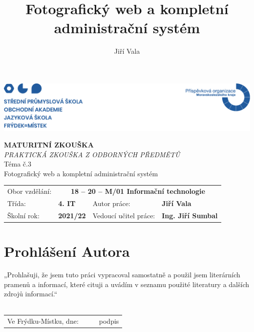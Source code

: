 \documentclass[12pt,a4paper]{report}
\title{Fotografický web a kompletní administrační systém}
\author{Jiří Vala}
\date{}
\begin{document}
\renewcommand*\listfigurename{}
\renewcommand{\figurename}{Obr.}
\renewcommand\refname{}



\begin{titlepage}
  \begin{adjustwidth}{-20mm}{-7.5mm} 
		\vspace*{-1.5cm}
		\noindent\includegraphics[width=\linewidth]{header.png}
	\end{adjustwidth}
	\begin{center}
		\vspace*{0.2cm}
    \color{pojblue}
		\Huge\textbf{MATURITNÍ ZKOUŠKA}
    \color{black}
    \vspace*{1cm} \\
		\large \emph{PRAKTICKÁ ZKOUŠKA Z ODBORNÝCH PŘEDMĚTŮ}
		\vspace*{1cm} \\
		\Large Téma č.3 \\
		\vspace*{1cm}
		\Large Fotografický web a kompletní administrační systém \\
		\vfill
		\normalsize
	\end{center}
	\begin{tabularx}{\textwidth}{l@{\hskip 0.5cm}XXl}
		Obor vzdělání: & \multicolumn{3}{c}{\textbf{18 – 20 – M/01 Informační technologie}} \\[10pt]
		Třída: & \textbf{4. IT} & Autor práce: & \textbf{Jiří Vala} \\[10pt]
		Školní rok: & \textbf{2021/22} & Vedoucí učitel práce: & \textbf{Ing. Jiří Sumbal}
		\vspace*{1cm}
	\end{tabularx}
\end{titlepage}

\section*{Prohlášení Autora}
  „Prohlašuji, že jsem tuto práci vypracoval samostatně a použil jsem literárních pramenů a informací, které cituji a uvádím v seznamu použité literatury a dalších zdrojů informací.“ \\
	\vspace*{0.5cm} \\
	\renewcommand{\arraystretch}{2}
	\begin{tabularx}{\textwidth}{l@{\hskip 0.75cm}X@{\hskip 1.5cm}X@{\hskip 0.75cm}l}
		Ve Frýdku-Místku, dne: & \dotfill & \dotfill & podpis \\
	\end{tabularx}
  \clearpage
\end{document}
